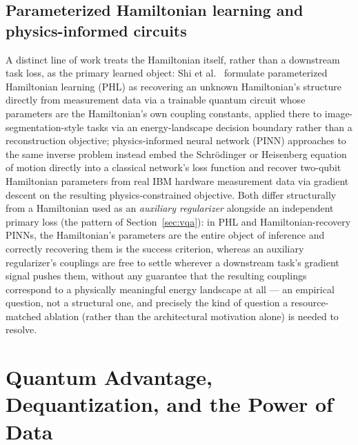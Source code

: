 \documentclass[11pt]{article}
\begin{document}
\subsection{Parameterized Hamiltonian learning and physics-informed circuits}
A distinct line of work treats the Hamiltonian itself, rather than a downstream task loss, as the primary learned object: Shi et al.\ \cite{Shi2022} formulate parameterized Hamiltonian learning (PHL) as recovering an unknown Hamiltonian's structure directly from measurement data via a trainable quantum circuit whose parameters are the Hamiltonian's own coupling constants, applied there to image-segmentation-style tasks via an energy-landscape decision boundary rather than a reconstruction objective; physics-informed neural network (PINN) approaches to the same inverse problem \cite{Chinni2023} instead embed the Schr\"odinger or Heisenberg equation of motion directly into a classical network's loss function and recover two-qubit Hamiltonian parameters from real IBM hardware measurement data via gradient descent on the resulting physics-constrained objective. Both differ structurally from a Hamiltonian used as an \emph{auxiliary regularizer} alongside an independent primary loss (the pattern of Section~\ref{sec:vqa}): in PHL and Hamiltonian-recovery PINNs, the Hamiltonian's parameters are the entire object of inference and correctly recovering them is the success criterion, whereas an auxiliary regularizer's couplings are free to settle wherever a downstream task's gradient signal pushes them, without any guarantee that the resulting couplings correspond to a physically meaningful energy landscape at all — an empirical question, not a structural one, and precisely the kind of question a resource-matched ablation (rather than the architectural motivation alone) is needed to resolve.

\section{Quantum Advantage, Dequantization, and the Power of Data}
\label{sec:advantage}
\end{document}

